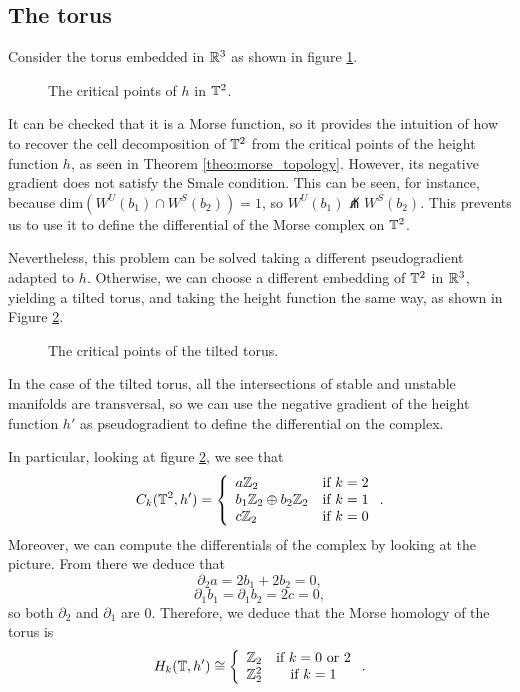 \subsection{The torus}

\begin{exmpl} Consider the torus embedded in $\mathbb{R}^3$ as shown in figure \ref{figure:example3}.

\begin{figure} [h]
	\centering
	
	\caption{The critical points of $h$ in $\mathbb{T}^2$.}
	\label{figure:example3}
\end{figure}

It can be checked that it is a Morse function, so it provides the intuition of how to recover the cell decomposition of $\mathbb{T}^2$ from the critical points of the height function $h$, as seen in Theorem \ref{theo:morse_topology}. However, its negative gradient does not satisfy the Smale condition. This can be seen, for instance, because $\text{dim}(W^U(b_1)\cap W^S(b_2)) = 1$, so $W^U(b_1)\not\pitchfork W^S(b_2)$. This prevents us to use it to define the differential of the Morse complex on $\mathbb{T}^2$.
\end{exmpl}

Nevertheless, this problem can be solved taking a different pseudogradient adapted to $h$. Otherwise, we can choose a different embedding of $\mathbb{T}^2$ in $\mathbb{R}^3$, yielding a tilted torus, and taking the height function the same way, as shown in Figure \ref{figure:example4}.

\begin{exmpl}
\begin{figure} [h]
	\centering
	
	\caption{The critical points of the tilted torus.}
	\label{figure:example4}
\end{figure}

In the case of the tilted torus, all the intersections of stable and unstable manifolds are transversal, so we can use the negative gradient of the height function $h'$ as pseudogradient to define the differential on the complex.

In particular, looking at figure \ref{figure:example4}, we see that
\[C_k(\mathbb{T}^2,h') = \left\{ \begin{array}{lc} a \mathbb{Z}_2 & \text{if } k=2 \\ b_1\mathbb{Z}_2 \oplus b_2 \mathbb{Z}_2 & \text{if } k=1 \\ c\mathbb{Z}_2 & \text{if } k=0 \end{array} \right. .\]
Moreover, we can compute the differentials of the complex by looking at the picture. From there we deduce that
\[\partial_2a = 2b_1 + 2b_2 = 0,\]
\[\partial_1 b_1 = \partial_1 b_2 = 2c = 0 ,\]
so both $\partial_2$ and $\partial_1$ are $0$. Therefore, we deduce that the Morse homology of the torus is
\[H_k(\mathbb{T},h') \cong \left\{ \begin{array}{lc} \mathbb{Z}_2 & \text{if } k=0 \text{ or } 2 \\ \mathbb{Z}_2^2 & \text{if } k=1 \end{array} \right. .\]
\end{exmpl}

